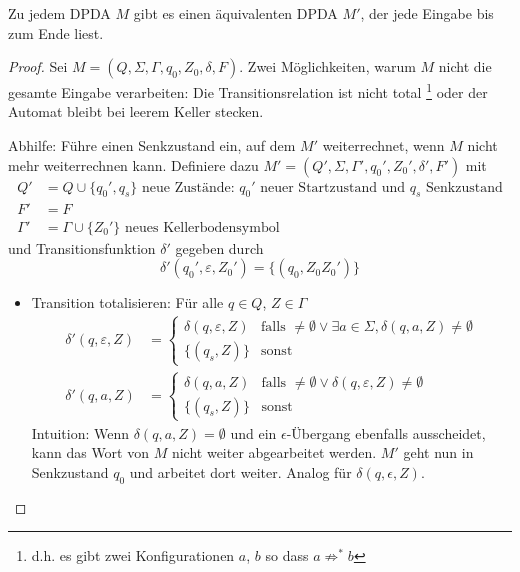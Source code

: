 \begin{lemma}[name={[\acs*{DPDA}, der gesamte Eingabe verarbeitet]}]
        \label{lem:DPDA ges. Eingabe}
        Zu jedem \ac{DPDA} $M$ gibt es einen äquivalenten \ac{DPDA} $M'$, der
        jede Eingabe bis zum Ende liest.
\end{lemma}
\begin{proof}

  Sei $M = (Q, \Sigma, \Gamma, q_0, Z_0, \delta, F)$. 
  Zwei Möglichkeiten, warum $M$ nicht die gesamte Eingabe verarbeiten:
  Die Transitionsrelation ist nicht total \footnote{d.h. es gibt zwei Konfigurationen $a$, $b$
  so dass $a \not \Rightarrow^* b$} oder der Automat bleibt bei
  leerem Keller stecken.

  Abhilfe: Führe einen Senkzustand ein, auf dem $M'$ weiterrechnet, wenn $M$ nicht mehr weiterrechnen kann. Definiere dazu $M' = (Q', \Sigma, \Gamma', q_0', Z_0', \delta', F')$ mit
  \begin{align*}
  Q' &= Q \cup \{q_0', q_s\} \text{ neue Zustände: $q_0'$ neuer Startzustand und $q_s$ Senkzustand} \\
  F' &= F \\
  \Gamma' &= \Gamma \cup \{Z_0'\} \text{ neues Kellerbodensymbol}
  \end{align*}
  und Transitionsfunktion $\delta'$ gegeben durch
  \[\delta' (q_0', \varepsilon, Z_0') = \{ (q_0, Z_0Z_0') \} \]
  \begin{itemize}
  \item Transition totalisieren: Für alle $q\in Q$, $Z \in \Gamma$\\
    \begin{align*}
      \delta' (q, \varepsilon, Z) &=
      \begin{cases}
        \delta (q, \varepsilon, Z) & \text{falls
        }\ne\emptyset\vee\exists a\in\Sigma, \delta (q, a, Z)\ne \emptyset \\
        \{ (q_s, Z) \} & \text{sonst}
      \end{cases} \\
      \delta' (q, a, Z) &=
      \begin{cases}
        \delta (q, a, Z) & \text{falls }\ne\emptyset\vee\delta (q,
        \varepsilon, Z) \ne \emptyset \\
        \{ (q_s, Z) \} & \text{sonst}
      \end{cases}
    \end{align*}
    Intuition: Wenn $\delta(q, a, Z) = \emptyset$ und ein $\epsilon$-Übergang ebenfalls ausscheidet, kann das Wort von $M$ nicht weiter abgearbeitet werden. $M'$ geht nun in Senkzustand $q_0$ und arbeitet dort weiter. Analog für $\delta(q, \epsilon, Z)$.

\end{itemize}
\end{proof}
